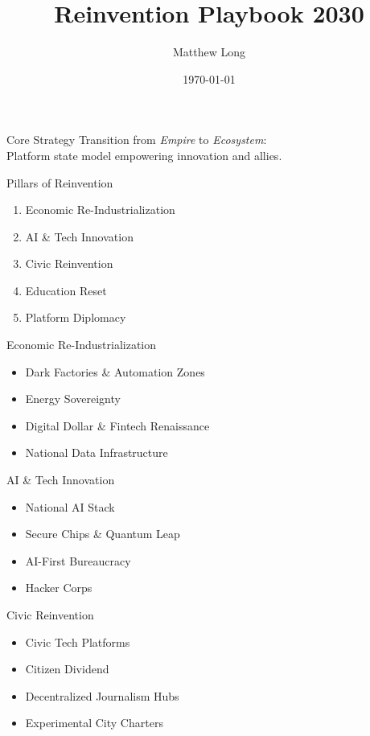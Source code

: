 \documentclass{beamer}
\title{Reinvention Playbook 2030}
\author{Matthew Long}
\date{\today}
\begin{document}
\frame{\titlepage}

\begin{frame}{Core Strategy}
Transition from \emph{Empire} to \emph{Ecosystem}: \\
Platform state model empowering innovation and allies.
\end{frame}

\begin{frame}{Pillars of Reinvention}
\begin{enumerate}
    \item Economic Re-Industrialization
    \item AI \& Tech Innovation
    \item Civic Reinvention
    \item Education Reset
    \item Platform Diplomacy
\end{enumerate}
\end{frame}

\begin{frame}{Economic Re-Industrialization}
\begin{itemize}
    \item Dark Factories \& Automation Zones
    \item Energy Sovereignty
    \item Digital Dollar \& Fintech Renaissance
    \item National Data Infrastructure
\end{itemize}
\end{frame}

\begin{frame}{AI \& Tech Innovation}
\begin{itemize}
    \item National AI Stack
    \item Secure Chips \& Quantum Leap
    \item AI-First Bureaucracy
    \item Hacker Corps
\end{itemize}
\end{frame}

\begin{frame}{Civic Reinvention}
\begin{itemize}
    \item Civic Tech Platforms
    \item Citizen Dividend
    \item Decentralized Journalism Hubs
    \item Experimental City Charters
\end{itemize}
\end{frame}
\end{document}
